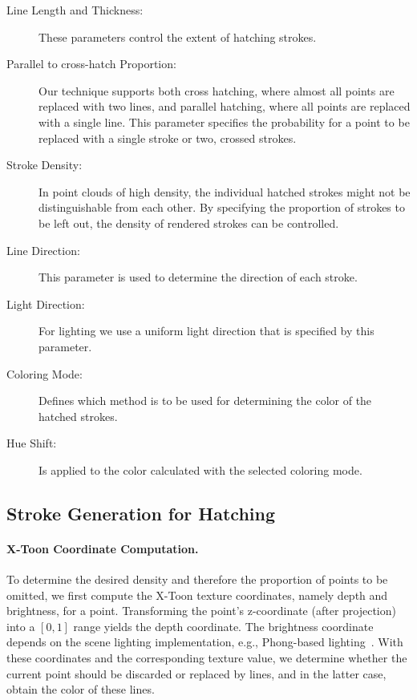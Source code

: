\documentclass[a4paper,twoside]{article}
\begin{document}
\begin{description}
    \item[Line Length and Thickness:] 
        These parameters control the extent of hatching strokes.
    \item[Parallel to cross-hatch Proportion:] 
        Our technique supports both cross hatching, where almost all points are replaced with two lines, and parallel hatching, where all points are replaced with a single line. 
        This parameter specifies the probability for a point to be replaced with a single stroke or two, crossed strokes.
    \item[Stroke Density:] 
        In point clouds of high density, the individual hatched strokes might not be distinguishable from each other. 
        By specifying the proportion of strokes to be left out, the density of rendered strokes can be controlled.
    \item[Line Direction:] 
        This parameter is used to determine the direction of each stroke.
    \item[Light Direction:]
        For lighting we use a uniform light direction that is specified by this parameter.
    \item[Coloring Mode:] 
        Defines which method is to be used for determining the color of the hatched strokes.
    \item[Hue Shift:] 
        Is applied to the color calculated with the selected coloring mode.
\end{description}



\subsection{Stroke Generation for Hatching}
\label{PCNPR:SubSec:HatchStrokeGeneration}


\paragraph{X-Toon Coordinate Computation.}
%
To determine the desired density and therefore the proportion of points to be omitted, we first compute the X-Toon texture coordinates, namely depth and brightness, for a point.
Transforming the point's z-coordinate (after projection) into a $[0,1]$ range yields the depth coordinate. 
The brightness coordinate depends on the scene lighting implementation, e.g., Phong-based lighting~\cite{Phong1975}. 
With these coordinates and the corresponding texture value, we determine whether the current point should be discarded or replaced by lines, and in the latter case, obtain the color of these lines.
\end{document}
